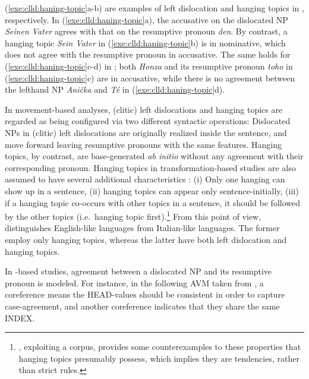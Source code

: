 \noindent (\ref{exe:clld:haning-topic}a-b) are examples of left
dislocation and hanging topics in , respectively.  In
(\ref{exe:clld:haning-topic}a), the accusative on the dislocated NP
\textit{Seinen Vater} agrees with that on the resumptive pronoun
\textit{den}. By contrast, a hanging topic \textit{Sein Vater} in
(\ref{exe:clld:haning-topic}b) is in nominative, which does not agree
with the resumptive pronoun in accusative. The same holds for
(\ref{exe:clld:haning-topic}c-d) in ; both \textit{Honza}
and its resumptive pronoun \textit{toho} in
(\ref{exe:clld:haning-topic}c) are in accusative, while there is no
agreement between the lefthand NP \textit{Ani\v{c}ka} and
\textit{T\'{e}} in (\ref{exe:clld:haning-topic}d).


In movement-based analyses, (clitic) left dislocations and hanging
topics are regarded as being configured via two different syntactic
operations: Dislocated NPs in (clitic) left dislocations are
originally realized inside the sentence, and move forward leaving
resumptive pronouns with the same features. Hanging topics, by
contrast, are base-generated \textit{ab initio} without any agreement
with their corresponding pronoun. Hanging topics in
transformation-based studies are also assumed to have several
additional characteristics \citep{frascarelli:00}: (i) Only one
hanging  can show up in a sentence, (ii) hanging topics can
appear only sentence-initially, (iii) if a hanging topic co-occurs
with other topics in a sentence, it should be followed by the other
topics (i.e.\ hanging topic first).\footnote{\citet{frascarelli:00},
  exploiting a corpus, provides some counterexamples to these
  properties that hanging topics presumably possess, which implies
  they are tendencies, rather than strict rules.}  From this point of
view, \cite{cinque:77} distinguishes English-like languages from
Italian-like languages. The former employ only
hanging topics, whereas the latter have both left dislocation and
hanging topics.


In -based studies, agreement between a dislocated NP and its
resumptive pronoun is modeled. For instance, in the following AVM
taken from \citet[p.\ 350]{bildhauer:08}, a coreference  means
the HEAD-values should be consistent in order to capture
case-agreement, and another coreference  indicates that they
share the same INDEX.



